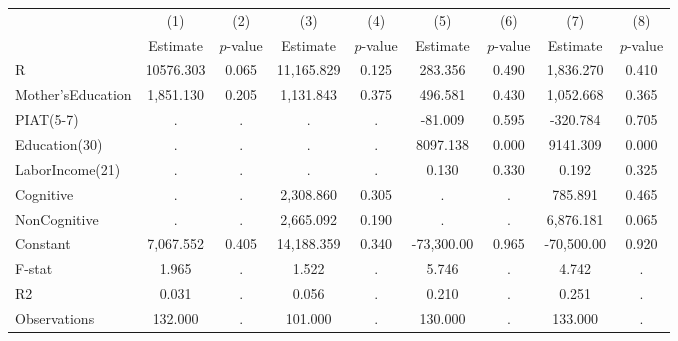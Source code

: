 \begin{tabular}{lcccccccc} \toprule
 & (1) & (2) & (3) & (4) & (5) & (6) & (7) & (8) \\ 
 & Estimate  & $p$-value  & Estimate  & $p$-value  & Estimate  & $p$-value  & Estimate  & $p$-value  \\  \midrule
R & 10576.303 &     0.065 & 11,165.829 &     0.125 &   283.356 &     0.490 &  1,836.270 &     0.410 \\  
Mother'sEducation &  1,851.130 &     0.205 &  1,131.843 &     0.375 &   496.581 &     0.430 &  1,052.668 &     0.365 \\  
PIAT(5-7) &         . &         . &         . &         . &   -81.009 &     0.595 &  -320.784 &     0.705 \\  
Education(30) &         . &         . &         . &         . &  8097.138 &     0.000 &  9141.309 &     0.000 \\  
LaborIncome(21) &         . &         . &         . &         . &     0.130 &     0.330 &     0.192 &     0.325 \\  
Cognitive &         . &         . &  2,308.860 &     0.305 &         . &         . &   785.891 &     0.465 \\  
NonCognitive &         . &         . &  2,665.092 &     0.190 &         . &         . &  6,876.181 &     0.065 \\  
Constant &  7,067.552 &     0.405 & 14,188.359 &     0.340 & -73,300.00 &     0.965 & -70,500.00 &     0.920 \\  \midrule
F-stat &     1.965 &         . &     1.522 &         . &     5.746 &         . &     4.742 &         . \\  
R2 &     0.031 &         . &     0.056 &         . &     0.210 &         . &     0.251 &         . \\  
Observations &   132.000 &         . &   101.000 &         . &   130.000 &         . &   133.000 &         . \\  
\bottomrule  \end{tabular}
